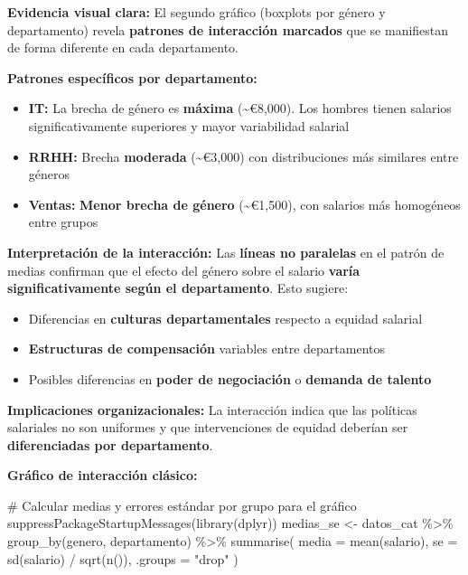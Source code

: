 \documentclass[
  letterpaper,
  DIV=11,
  numbers=noendperiod]{scrreprt}
\newenvironment{Shaded}{\begin{snugshade}}{\end{snugshade}}
\newcommand{\AttributeTok}[1]{\textcolor[rgb]{0.40,0.45,0.13}{#1}}
\newcommand{\CommentTok}[1]{\textcolor[rgb]{0.37,0.37,0.37}{#1}}
\newcommand{\FunctionTok}[1]{\textcolor[rgb]{0.28,0.35,0.67}{#1}}
\newcommand{\NormalTok}[1]{\textcolor[rgb]{0.00,0.23,0.31}{#1}}
\newcommand{\OtherTok}[1]{\textcolor[rgb]{0.00,0.23,0.31}{#1}}
\newcommand{\SpecialCharTok}[1]{\textcolor[rgb]{0.37,0.37,0.37}{#1}}
\newcommand{\StringTok}[1]{\textcolor[rgb]{0.13,0.47,0.30}{#1}}
\providecommand{\tightlist}{%
  \setlength{\itemsep}{0pt}\setlength{\parskip}{0pt}}
\begin{document}
\begin{tcolorbox}
\textbf{Evidencia visual clara:} El segundo gráfico (boxplots por género
y departamento) revela \textbf{patrones de interacción marcados} que se
manifiestan de forma diferente en cada departamento.

\textbf{Patrones específicos por departamento:}

\begin{itemize}
\tightlist
\item
  \textbf{IT:} La brecha de género es \textbf{máxima}
  (\textasciitilde€8,000). Los hombres tienen salarios
  significativamente superiores y mayor variabilidad salarial
\item
  \textbf{RRHH:} Brecha \textbf{moderada} (\textasciitilde€3,000) con
  distribuciones más similares entre géneros
\item
  \textbf{Ventas:} \textbf{Menor brecha de género}
  (\textasciitilde€1,500), con salarios más homogéneos entre grupos
\end{itemize}

\textbf{Interpretación de la interacción:} Las \textbf{líneas no
paralelas} en el patrón de medias confirman que el efecto del género
sobre el salario \textbf{varía significativamente según el
departamento}. Esto sugiere:

\begin{itemize}
\tightlist
\item
  Diferencias en \textbf{culturas departamentales} respecto a equidad
  salarial
\item
  \textbf{Estructuras de compensación} variables entre departamentos
\item
  Posibles diferencias en \textbf{poder de negociación} o
  \textbf{demanda de talento}
\end{itemize}

\textbf{Implicaciones organizacionales:} La interacción indica que las
políticas salariales no son uniformes y que intervenciones de equidad
deberían ser \textbf{diferenciadas por departamento}.

\textbf{Gráfico de interacción clásico:}

\begin{Shaded}
\begin{Highlighting}[]
\CommentTok{\# Calcular medias y errores estándar por grupo para el gráfico}
\FunctionTok{suppressPackageStartupMessages}\NormalTok{(}\FunctionTok{library}\NormalTok{(dplyr))}
\NormalTok{medias\_se }\OtherTok{\textless{}{-}}\NormalTok{ datos\_cat }\SpecialCharTok{\%\textgreater{}\%}
  \FunctionTok{group\_by}\NormalTok{(genero, departamento) }\SpecialCharTok{\%\textgreater{}\%}
  \FunctionTok{summarise}\NormalTok{(}
    \AttributeTok{media =} \FunctionTok{mean}\NormalTok{(salario),}
    \AttributeTok{se =} \FunctionTok{sd}\NormalTok{(salario) }\SpecialCharTok{/} \FunctionTok{sqrt}\NormalTok{(}\FunctionTok{n}\NormalTok{()),}
    \AttributeTok{.groups =} \StringTok{"drop"}
\NormalTok{  )}


\end{Highlighting}
\end{Shaded}
\end{tcolorbox}
\end{document}
